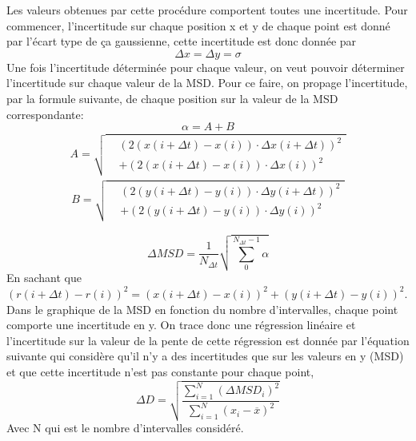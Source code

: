 \documentclass[conference]{IEEEtran}
\begin{document}
Les valeurs obtenues par cette procédure comportent toutes une incertitude. Pour commencer, l'incertitude sur chaque 
position x et y de chaque point est donné par l'écart type de ça gaussienne, cette incertitude est donc donnée par 
\begin{equation}
  \Delta x=\Delta y=\sigma 
\end{equation}
Une fois l'incertitude déterminée pour chaque valeur, on veut pouvoir déterminer l'incertitude sur chaque valeur de la MSD. 
Pour ce faire, on propage l'incertitude, par la formule suivante, de chaque position sur la valeur de la MSD  correspondante: 
\begin{equation}
  \alpha =A+B
\end{equation}
\begin{align*}
  A = \sqrt{
    \begin{aligned}
      &\left( 2(x(i+\Delta t) - x(i))\cdot \Delta x(i+\Delta t) \right)^2 \\
      &+ \left( 2(x(i+\Delta t) - x(i))\cdot \Delta x(i) \right)^2
    \end{aligned}
  }
\end{align*}
\begin{align*}
  B = \sqrt{
    \begin{aligned}
      &\left( 2(y(i+\Delta t) - y(i))\cdot \Delta y(i+\Delta t) \right)^2 \\
      &+ \left( 2(y(i+\Delta t) - y(i))\cdot \Delta y(i) \right)^2
    \end{aligned}
  }
\end{align*}

\begin{equation}
  \Delta MSD=\frac{1}{N_{\Delta t}}\sqrt{\sum_{0}^{N_{\Delta t}-1}\alpha }
\end{equation}
En sachant que $\left ( r(i+\Delta t)-r(i) \right )^{2}=\left ( x(i+\Delta t)-x(i) \right )^{2}+\left ( y(i+\Delta t)-y(i) \right )^{2}$.
Dans le graphique de la MSD en fonction du nombre d'intervalles, chaque point comporte une incertitude en y. On 
trace donc une régression linéaire et l'incertitude sur la valeur de la pente de cette régression est donnée par l'équation suivante
qui considère qu'il n'y a des incertitudes que sur les valeurs en y (MSD) et que cette incertitude n'est pas constante pour chaque point, 
\begin{equation}
  \Delta D=\sqrt{\frac{\sum_{i=1}^{N}(\Delta MSD_{i})^{2}}{\sum_{i=1}^{N}{(x_{i}-\overline{x})^{2}}}}
\end{equation}
Avec N qui est le nombre d'intervalles considéré. 
\end{document}
